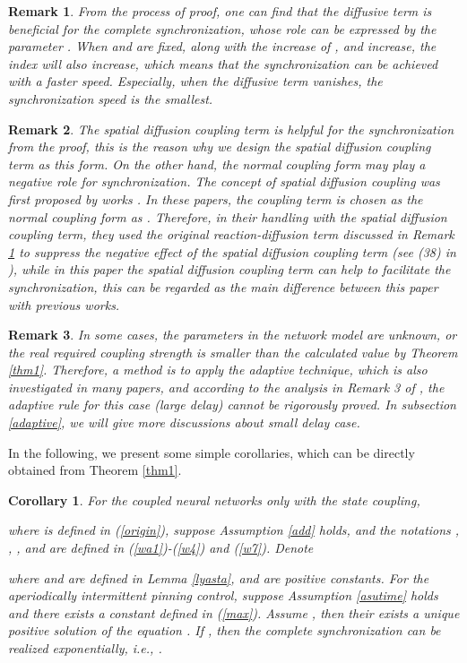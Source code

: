 \documentclass[review]{elsarticle}
\newtheorem{col}{Corollary}
\newtheorem{rem}{Remark}
\begin{document}
\begin{rem}\label{red}
From the process of proof, one can find that the diffusive term  is beneficial for the complete synchronization, whose role can be expressed by the parameter . When  and  are fixed, along with the increase of ,  and  increase, the index  will also increase, which means that the synchronization can be achieved with a faster speed. Especially, when the diffusive term  vanishes, the synchronization speed is the smallest.
\end{rem}

\begin{rem}
The spatial diffusion coupling term   is helpful for the synchronization from the proof, this is the reason why we design the spatial diffusion coupling term as this form. On the other hand, the normal coupling form  may play a negative role for synchronization. The concept of spatial diffusion coupling was first proposed by works \cite{WW2014,WWHR2016}. In these papers, the coupling term is chosen as the normal coupling form as . Therefore, in their handling with the spatial diffusion coupling term, they used the original reaction-diffusion term  discussed in Remark \ref{red} to suppress the negative effect of the spatial diffusion coupling term (see (38) in \cite{WWHR2016}), while in this paper the spatial diffusion coupling term can help to facilitate the synchronization, this can be regarded as the main difference between this paper with previous works.
\end{rem}

\begin{rem}
In some cases, the parameters in the network model are unknown, or the real required coupling strength is smaller than the calculated value by Theorem \ref{thm1}. Therefore, a method is to apply the adaptive technique, which is also investigated in many papers, and according to the analysis in Remark 3 of \cite{LC15}, the adaptive rule for this case (large delay) cannot be rigorously proved. In subsection \ref{adaptive}, we will give more discussions about small delay case.
\end{rem}

In the following, we present some simple corollaries, which can be directly obtained from Theorem \ref{thm1}.
\begin{col}
For the coupled neural networks only with the state coupling,

where  is defined in (\ref{origin}), suppose Assumption \ref{add} holds, and the notations , , ,  and  are defined in (\ref{wa1})-(\ref{w4}) and (\ref{w7}). Denote

where  and  are defined in Lemma \ref{lyasta},  and  are positive constants. For the aperiodically intermittent pinning control, suppose Assumption \ref{asutime} holds and there exists a constant  defined in (\ref{max}). Assume , then their exists a unique positive solution  of the equation
.
If , then the complete synchronization can be realized exponentially, i.e., .
\end{col}
\end{document}
